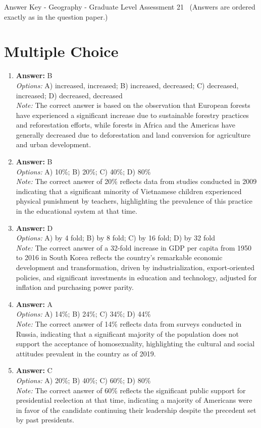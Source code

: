 \documentclass[12pt]{article}
\begin{document}
\begin{center}
Answer Key - Geography - Graduate Level Assessment 21 \
\small (Answers are ordered exactly as in the question paper.)
\end{center}

\section*{Multiple Choice}
\begin{enumerate}[label=\arabic*.]
\item \textbf{Answer:} B
\\ \textit{Options:} A) increased, increased; B) increased, decreased; C) decreased, increased; D) decreased, decreased
\\ \textit{Note:} The correct answer is based on the observation that European forests have experienced a significant increase due to sustainable forestry practices and reforestation efforts, while forests in Africa and the Americas have generally decreased due to deforestation and land conversion for agriculture and urban development.
\item \textbf{Answer:} B
\\ \textit{Options:} A) 10\%; B) 20\%; C) 40\%; D) 80\%
\\ \textit{Note:} The correct answer of 20\% reflects data from studies conducted in 2009 indicating that a significant minority of Vietnamese children experienced physical punishment by teachers, highlighting the prevalence of this practice in the educational system at that time.
\item \textbf{Answer:} D
\\ \textit{Options:} A) by 4 fold; B) by 8 fold; C) by 16 fold; D) by 32 fold
\\ \textit{Note:} The correct answer of a 32-fold increase in GDP per capita from 1950 to 2016 in South Korea reflects the country's remarkable economic development and transformation, driven by industrialization, export-oriented policies, and significant investments in education and technology, adjusted for inflation and purchasing power parity.
\item \textbf{Answer:} A
\\ \textit{Options:} A) 14\%; B) 24\%; C) 34\%; D) 44\%
\\ \textit{Note:} The correct answer of 14\% reflects data from surveys conducted in Russia, indicating that a significant majority of the population does not support the acceptance of homosexuality, highlighting the cultural and social attitudes prevalent in the country as of 2019.
\item \textbf{Answer:} C
\\ \textit{Options:} A) 20\%; B) 40\%; C) 60\%; D) 80\%
\\ \textit{Note:} The correct answer of 60\% reflects the significant public support for presidential reelection at that time, indicating a majority of Americans were in favor of the candidate continuing their leadership despite the precedent set by past presidents.
\end{enumerate}
\end{document}

